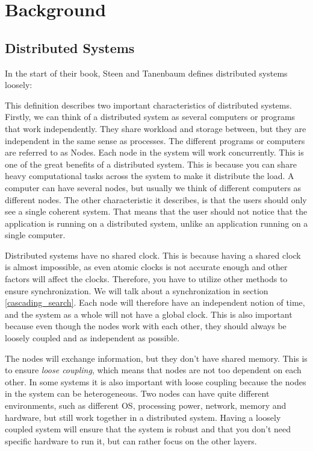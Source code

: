 \chapter{Background}


\section{Distributed Systems}
In the start of their book, Steen and Tanenbaum\cite{steen_distributed_2017} defines distributed systems loosely: 

This definition describes two important characteristics of distributed systems. Firstly, we can think of a distributed system as several computers or programs that work independently. They share workload and storage between, but they are independent in the same sense as processes. The different programs or computers are referred to as Nodes. Each node in the system will work concurrently. This is one of the great benefits of a distributed system. This is because you can share heavy computational tasks across the system to make it distribute the load. A computer can have several nodes, but usually we think of different computers as different nodes. The other characteristic it describes, is that the users should only see a single coherent system. That means that the user should not notice that the application is running on a distributed system, unlike an application running on a single computer.

Distributed systems have no shared clock. This is because having a shared clock is almost impossible, as even atomic clocks is not accurate enough and other factors will affect the clocks. Therefore, you have to utilize other methods to ensure synchronization. We will talk about a synchronization in section \ref{cascading_search}. Each node will therefore have an independent notion of time, and the system as a whole will not have a global clock\cite{steen_distributed_2017}. This is also important because even though the nodes work with each other, they should always be loosely coupled and as independent as possible.

The nodes will exchange information, but they don’t have shared memory. This is to ensure \textit{loose coupling}, which means that nodes are not too dependent on each other. In some systems it is also important with loose coupling because the nodes in the system can be heterogeneous. Two nodes can have quite different environments, such as different OS, processing power, network, memory and hardware, but still work together in a distributed system. Having a loosely coupled system will ensure that the system is robust and that you don't need specific hardware to run it, but can rather focus on the other layers. 

